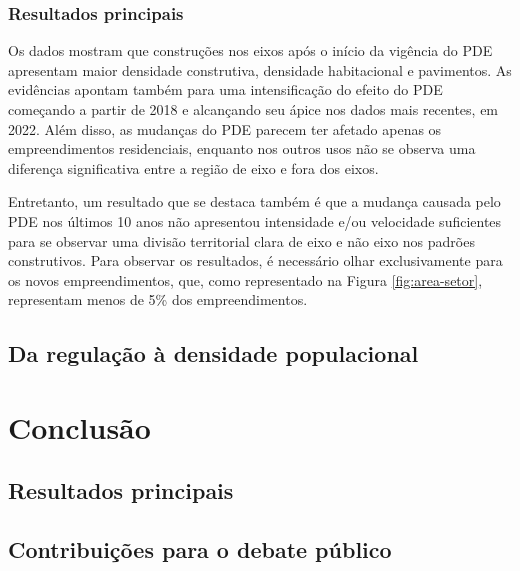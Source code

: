 




\subsection{Resultados principais}

Os dados mostram que construções nos eixos após o início da vigência do PDE apresentam maior densidade construtiva, densidade habitacional e pavimentos. As evidências apontam também para uma intensificação do efeito do PDE começando a partir de 2018 e alcançando seu ápice nos dados mais recentes, em 2022. Além disso, as mudanças do PDE parecem ter afetado apenas os empreendimentos residenciais, enquanto nos outros usos não se observa uma diferença significativa entre a região de eixo e fora dos eixos.

Entretanto, um resultado que se destaca também é que a mudança causada pelo PDE nos últimos 10 anos não apresentou intensidade e/ou velocidade suficientes para se observar uma divisão territorial clara de eixo e não eixo nos padrões construtivos. Para observar os resultados, é necessário olhar exclusivamente para os novos empreendimentos, que, como representado na Figura \ref{fig:area-setor}, representam menos de 5\% dos empreendimentos.




\section{Da regulação à densidade populacional}
\label{sec:perg3}

\chapter{Conclusão}
\label{chp:conclusao}

\section{Resultados principais}
\label{sec:conclusao}

\section{Contribuições para o debate público}
\label{sec:contribuicoes}

